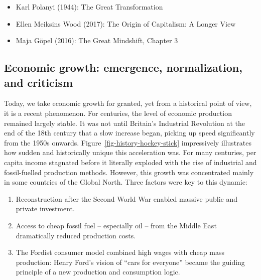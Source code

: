 \documentclass[
  a4paper,
  openany]{book}
\providecommand{\tightlist}{%
  \setlength{\itemsep}{0pt}\setlength{\parskip}{0pt}}
\begin{document}
\begin{tcolorbox}[enhanced jigsaw, coltitle=black, bottomtitle=1mm, opacitybacktitle=0.6, titlerule=0mm, opacityback=0, leftrule=.75mm, colbacktitle=quarto-callout-note-color!10!white, bottomrule=.15mm, toptitle=1mm, breakable, title={Further readings}, arc=.35mm, rightrule=.15mm, toprule=.15mm, left=2mm, colback=white, colframe=quarto-callout-note-color-frame]

\begin{itemize}
\item
  Karl Polanyi (1944): The Great Transformation
\item
  Ellen Meiksins Wood (2017): The Origin of Capitalism: A Longer View
\item
  Maja Göpel (2016): The Great Mindshift, Chapter 3
\end{itemize}

\end{tcolorbox}

\subsection{Economic growth: emergence, normalization, and
criticism}\label{economic-growth-emergence-normalization-and-criticism}

Today, we take economic growth for granted, yet from a historical point
of view, it is a recent phenomenon. For centuries, the level of economic
production remained largely stable. It was not until Britain's
Industrial Revolution at the end of the 18th century that a slow
increase began, picking up speed significantly from the 1950s onwards.
Figure~\ref{fig-history-hockey-stick} impressively illustrates how
sudden and historically unique this acceleration was. For many
centuries, per capita income stagnated before it literally exploded with
the rise of industrial and fossil-fuelled production methods. However,
this growth was concentrated mainly in some countries of the Global
North. Three factors were key to this dynamic:

\begin{enumerate}
\def\labelenumi{\arabic{enumi}.}
\tightlist
\item
  Reconstruction after the Second World War enabled massive public and
  private investment.
\item
  Access to cheap fossil fuel -- especially oil -- from the Middle East
  dramatically reduced production costs.
\item
  The Fordist consumer model combined high wages with cheap mass
  production: Henry Ford's vision of ``cars for everyone'' became the
  guiding principle of a new production and consumption logic.
\end{enumerate}
\end{document}

